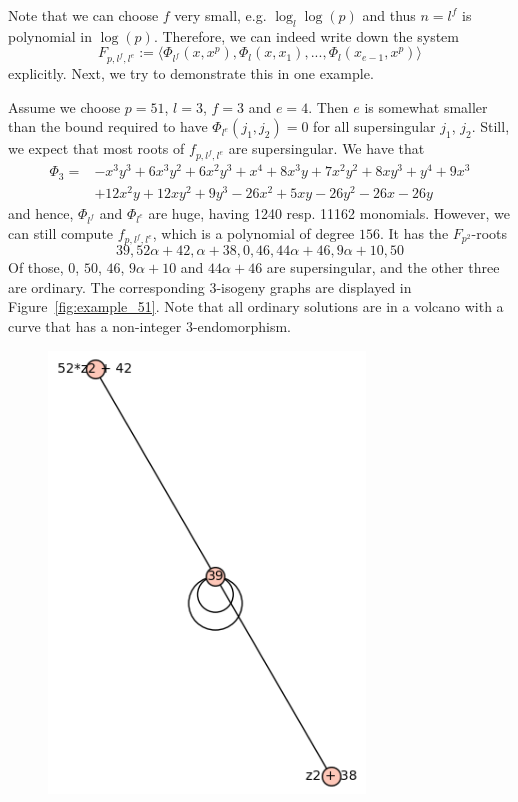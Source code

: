 Note that we can choose $f$ very small, e.g. $\log_l\log(p)$ and thus $n = l^f$ is polynomial in $\log(p)$.
Therefore, we can indeed write down the system
\begin{equation*}
    F_{p, l^f, l^e} := \langle \Phi_{l^f}(x, x^p), \Phi_l(x, x_1), ..., \Phi_l(x_{e - 1}, x^p) \rangle
\end{equation*}
explicitly.
Next, we try to demonstrate this in one example.
\begin{example}
    Assume we choose $p = 51$, $l = 3$, $f = 3$ and $e = 4$.
    Then $e$ is somewhat smaller than the bound required to have $\Phi_{l^e}(j_1, j_2) = 0$ for all supersingular $j_1$, $j_2$.
    Still, we expect that most roots of $f_{p, l^f, l^e}$ are supersingular.
    We have that
    \begin{align*}
        \Phi_3 =& -x^3y^3 + 6x^3y^2 + 6x^2y^3 + x^4 + 8x^3y + 7x^2y^2 + 8xy^3 + y^4 + 9x^3 \\
        &+ 12x^2y + 12xy^2 + 9y^3 - 26x^2 + 5xy - 26y^2 - 26x - 26y
    \end{align*}
    and hence, $\Phi_{l^f}$ and $\Phi_{l^e}$ are huge, having 1240 resp. 11162 monomials.
    However, we can still compute $f_{p, l^f, l^e}$, which is a polynomial of degree $156$.
    It has the $F_{p^2}$-roots
    \begin{equation*}
        39, 52\alpha + 42, \alpha + 38, 0, 46, 44\alpha + 46, 9\alpha + 10, 50
    \end{equation*}
    Of those, $0$, $50$, $46$, $9\alpha + 10$ and $44\alpha + 46$ are supersingular, and the other three are ordinary.
    The corresponding $3$-isogeny graphs are displayed in Figure~\ref{fig:example_51}.
    Note that all ordinary solutions are in a volcano with a curve that has a non-integer $3$-endomorphism.
    \begin{figure}
        \begin{minipage}{0.5\textwidth}
            \centering
            \includegraphics[width = 0.75\textwidth]{../example_51_ordinary.png}

\end{minipage}
\end{figure}
\end{example}
